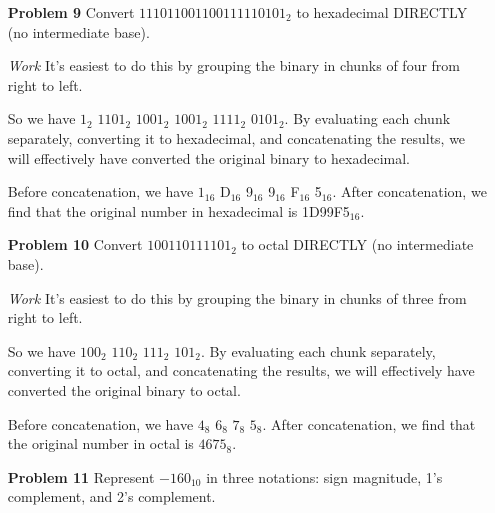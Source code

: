 \documentclass[12pt]{article}
\begin{document}
\begin{enumerate}
  \item[\textbf{Problem 9}] Convert $111011001100111110101_2$ to hexadecimal DIRECTLY (no intermediate base).
\end{enumerate}

\begin{enumerate}
  \item[\textit{Work}] It's easiest to do this by grouping the binary in chunks of four from right to left.
  \item[] So we have $1_2$ $1101_2$ $1001_2$ $1001_2$ $1111_2$ $0101_2$. By evaluating each chunk separately, converting it to hexadecimal, and concatenating the results, we will effectively have converted the original binary to hexadecimal.
  \item[] Before concatenation, we have $1_{16}$ D$_{16}$ 9$_{16}$ 9$_{16}$ F$_{16}$ 5$_{16}$. After concatenation, we find that the original number in hexadecimal is 1D99F5$_{16}$.
\end{enumerate}


\begin{enumerate}
  \item[\textbf{Problem 10}] Convert $100110111101_2$ to octal DIRECTLY (no intermediate base).
\end{enumerate}

\begin{enumerate}
  \item[\textit{Work}] It's easiest to do this by grouping the binary in chunks of three from right to left.
  \item[] So we have $100_2$ $110_2$ $111_2$ $101_2$. By evaluating each chunk separately, converting it to octal, and concatenating the results, we will effectively have converted the original binary to octal.
  \item[] Before concatenation, we have $4_8$ $6_8$ $7_8$ $5_8$. After concatenation, we find that the original number in octal is $4675_8$.
\end{enumerate}


\begin{enumerate}
  \item[\textbf{Problem 11}] Represent $-160_{10}$ in three notations: sign magnitude, 1’s complement, and 2’s complement.
\end{enumerate}
\end{document}
